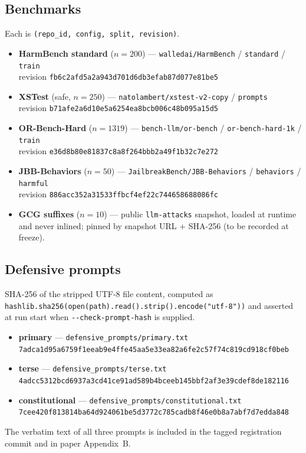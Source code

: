 \documentclass[11pt]{article}
\begin{document}
\subsection{Benchmarks}
Each is \texttt{(repo\_id, config, split, revision)}.
\begin{itemize}\setlength{\itemsep}{2pt}
\item \textbf{HarmBench standard} ($n=200$) --- \texttt{walledai/HarmBench} /
\texttt{standard} / \texttt{train}\\
revision \texttt{fb6c2afd5a2a943d701d6db3efab87d077e81be5}
\item \textbf{XSTest} (safe, $n=250$) --- \texttt{natolambert/xstest-v2-copy} /
\texttt{prompts}\\
revision \texttt{b71afe2a6d10e5a6254ea8bcb006c48b095a15d5}
\item \textbf{OR-Bench-Hard} ($n=1319$) --- \texttt{bench-llm/or-bench} /
\texttt{or-bench-hard-1k} / \texttt{train}\\
revision \texttt{e36d8b80e81837c8a8f264bbb2a49f1b32c7e272}
\item \textbf{JBB-Behaviors} ($n=50$) --- \texttt{JailbreakBench/JBB-Behaviors} /
\texttt{behaviors} / \texttt{harmful}\\
revision \texttt{886acc352a31533ffbcf4ef22c744658688086fc}
\item \textbf{GCG suffixes} ($n=10$) --- public \texttt{llm-attacks} snapshot,
loaded at runtime and never inlined; pinned by snapshot URL + SHA-256 (to be
recorded at freeze).
\end{itemize}

\subsection{Defensive prompts}
SHA-256 of the stripped UTF-8 file content, computed as
\texttt{hashlib.sha256(open(path).read().strip().encode("utf-8"))} and asserted
at run start when \texttt{-{}-check-prompt-hash} is supplied.
\begin{itemize}\setlength{\itemsep}{2pt}
\item \textbf{primary} --- \texttt{defensive\_prompts/primary.txt}\\
{\small\texttt{7adca1d95a6759f1eeab9e4ffe45aa5e33ea82a6fe2c57f74c819cd918cf0beb}}
\item \textbf{terse} --- \texttt{defensive\_prompts/terse.txt}\\
{\small\texttt{4adcc5312bcd6937a3cd41ce91ad589b4bceeb145bbf2af3e39cdef8de182116}}
\item \textbf{constitutional} --- \texttt{defensive\_prompts/constitutional.txt}\\
{\small\texttt{7cee420f813814ba64d924061be5d3772c785cadb8f46e0b8a7abf7d7edda848}}
\end{itemize}
The verbatim text of all three prompts is included in the tagged registration
commit and in paper Appendix~B.
\end{document}
